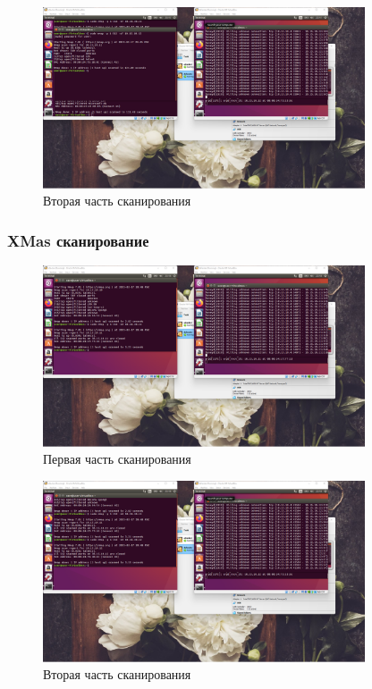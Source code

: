 \documentclass[a4paper]{article}
\begin{document}
  \begin{figure}[H]
    \centering
    \includegraphics[width=0.85\textwidth]{01_00 (39)}
    \caption{Вторая часть сканирования}
  \end{figure}

  \subsubsection{XMas сканирование}
  \begin{figure}[H]
    \centering
    \includegraphics[width=0.85\textwidth]{01_00 (41)}
    \caption{Первая часть сканирования}
  \end{figure}

  \begin{figure}[H]
    \centering
    \includegraphics[width=0.85\textwidth]{01_00 (42)}
    \caption{Вторая часть сканирования}
  \end{figure}
\end{document}
